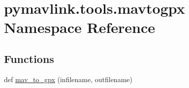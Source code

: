 \hypertarget{namespacepymavlink_1_1tools_1_1mavtogpx}{}\section{pymavlink.\+tools.\+mavtogpx Namespace Reference}
\label{namespacepymavlink_1_1tools_1_1mavtogpx}
\subsection*{Functions}
\begin{DoxyCompactItemize}
\item 
def \hyperlink{namespacepymavlink_1_1tools_1_1mavtogpx_a76a1d5d7118b71ed2aea6781eedc6d13}{mav\+\_\+to\+\_\+gpx} (infilename, outfilename)
\end{DoxyCompactItemize}
